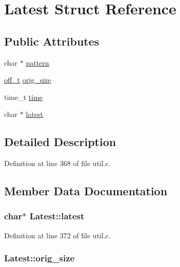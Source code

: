\hypertarget{struct_latest}{}\section{Latest Struct Reference}
\label{struct_latest}
\subsection*{Public Attributes}
\begin{DoxyCompactItemize}
\item 
char $\ast$ \hyperlink{struct_latest_aa3f983c4a8a31b7e12d6127cea049617}{pattern}
\item 
\hyperlink{macconfig_8h_ae498af04567b740d66e09d36613c2cd8}{off\+\_\+t} \hyperlink{struct_latest_ad715e4b446a896c1b611d767e88c3345}{orig\+\_\+size}
\item 
time\+\_\+t \hyperlink{struct_latest_a85a1c0ea155ddbfc9a793ad884498e0e}{time}
\item 
char $\ast$ \hyperlink{struct_latest_a7ba5f05c47c94ffffec71d9cb97e9f0a}{latest}
\end{DoxyCompactItemize}


\subsection{Detailed Description}


Definition at line 368 of file util.\+c.



\subsection{Member Data Documentation}
\subsubsection[{\texorpdfstring{latest}{latest}}]{\setlength{\rightskip}{0pt plus 5cm}char$\ast$ Latest\+::latest}\hypertarget{struct_latest_a7ba5f05c47c94ffffec71d9cb97e9f0a}{}\label{struct_latest_a7ba5f05c47c94ffffec71d9cb97e9f0a}


Definition at line 372 of file util.\+c.

\subsubsection[{\texorpdfstring{orig\+\_\+size}{orig_size}}]{ Latest\+::orig\+\_\+size}\hypertarget{struct_latest_ad715e4b446a896c1b611d767e88c3345}{}\label{struct_latest_ad715e4b446a896c1b611d767e88c3345}


